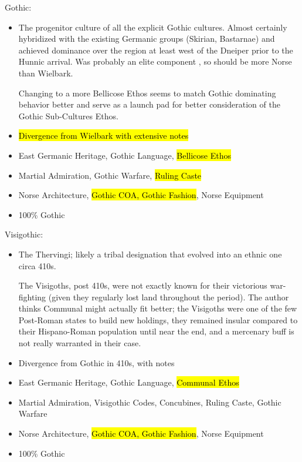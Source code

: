 \documentclass{article}
\begin{document}
	Gothic:
	\begin{itemize}
		\item The progenitor culture of all the explicit Gothic cultures.
		Almost certainly hybridized with the existing Germanic groups (Skirian, Bastarnae) and achieved dominance over the region at least west of the Dneiper prior to the Hunnic arrival.
		Was probably an elite component \cite{HeatherEmpiresAndBarbarians}, so should be more Norse than Wielbark.
		
		Changing to a more Bellicose Ethos seems to match Gothic dominating behavior better and serve as a launch pad for better consideration of the Gothic Sub-Cultures Ethos.
		\item \hl{Divergence from Wielbark with extensive notes}
		\item East Germanic Heritage, Gothic Language, \hl{Bellicose Ethos}
		\item Martial Admiration, Gothic Warfare, \hl{Ruling Caste}
		\item Norse Architecture, \hl{Gothic COA, Gothic Fashion}, Norse Equipment
		\item 100\% Gothic
	\end{itemize}
	
	Visigothic:
	\begin{itemize}
		\item The Thervingi; likely a tribal designation that evolved into an ethnic one circa 410s.
		
		The Visigoths, post 410s, were not exactly known for their victorious war-fighting (given they regularly lost land throughout the period).
		The author thinks Communal might actually fit better; the Visigoths were one of the few Post-Roman states to build new holdings, they remained insular compared to their Hispano-Roman population until near the end, and a mercenary buff is not really warranted in their case.
		\item Divergence from Gothic in 410s, with notes
		\item East Germanic Heritage, Gothic Language, \hl{Communal Ethos}
		\item Martial Admiration, Visigothic Codes, Concubines, Ruling Caste, Gothic Warfare
		\item Norse Architecture, \hl{Gothic COA, Gothic Fashion}, Norse Equipment
		\item 100\% Gothic
	\end{itemize}
	
\end{document}
